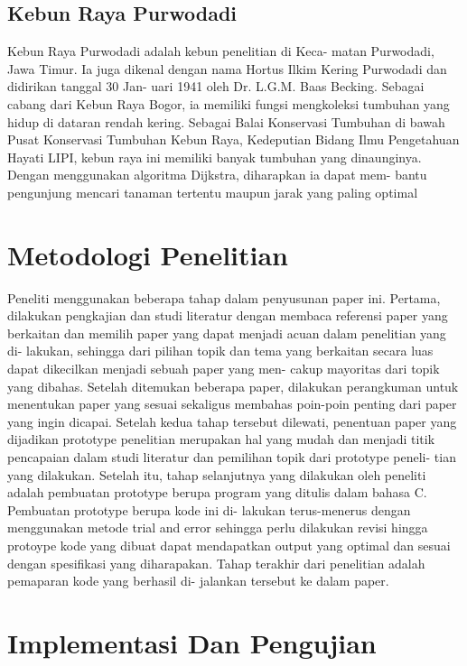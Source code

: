 \documentclass[conference]{IEEEtran}
\begin{document}
{\subsection{ Kebun Raya Purwodadi}
Kebun Raya Purwodadi adalah kebun penelitian di Keca-
matan Purwodadi, Jawa Timur. Ia juga dikenal dengan nama
Hortus Ilkim Kering Purwodadi dan didirikan tanggal 30 Jan-
uari 1941 oleh Dr. L.G.M. Baas Becking. Sebagai cabang dari
Kebun Raya Bogor, ia memiliki fungsi mengkoleksi tumbuhan
yang hidup di dataran rendah kering. Sebagai Balai Konservasi
Tumbuhan di bawah Pusat Konservasi Tumbuhan Kebun Raya,
Kedeputian Bidang Ilmu Pengetahuan Hayati LIPI, kebun raya
ini memiliki banyak tumbuhan yang dinaunginya. Dengan
menggunakan algoritma Dijkstra, diharapkan ia dapat mem-
bantu pengunjung mencari tanaman tertentu maupun jarak
yang paling optimal

\section{Metodologi Penelitian}
Peneliti menggunakan beberapa tahap dalam penyusunan
paper ini. Pertama, dilakukan pengkajian dan studi literatur
dengan membaca referensi paper yang berkaitan dan memilih
paper yang dapat menjadi acuan dalam penelitian yang di-
lakukan, sehingga dari pilihan topik dan tema yang berkaitan
secara luas dapat dikecilkan menjadi sebuah paper yang men-
cakup mayoritas dari topik yang dibahas. Setelah ditemukan
beberapa paper, dilakukan perangkuman untuk menentukan
paper yang sesuai sekaligus membahas poin-poin penting
dari paper yang ingin dicapai. Setelah kedua tahap tersebut
dilewati, penentuan paper yang dijadikan prototype penelitian
merupakan hal yang mudah dan menjadi titik pencapaian
dalam studi literatur dan pemilihan topik dari prototype peneli-
tian yang dilakukan.
Setelah itu, tahap selanjutnya yang dilakukan oleh peneliti
adalah pembuatan prototype berupa program yang ditulis
dalam bahasa C. Pembuatan prototype berupa kode ini di-
lakukan terus-menerus dengan menggunakan metode trial and
error sehingga perlu dilakukan revisi hingga protoype kode
yang dibuat dapat mendapatkan output yang optimal dan
sesuai dengan spesifikasi yang diharapakan. Tahap terakhir dari penelitian adalah pemaparan kode yang berhasil di-
jalankan tersebut ke dalam paper.


\section{Implementasi Dan Pengujian}
}
\end{document}
